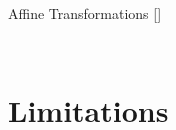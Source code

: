 \documentclass[10pt]{beamer}
\begin{document}
\begin{frame}{Affine Transformations \hfill \small [\cite{Carrazza:2018nmd}]}
\begin{columns}
\begin{column}{0.5 \textwidth}
\begin{figure}
\begin{center}
        \end{center}
      \end{figure}
        \end{column}
    \end{columns}

   
\end{frame}

    

\section{Limitations}
\end{document}
